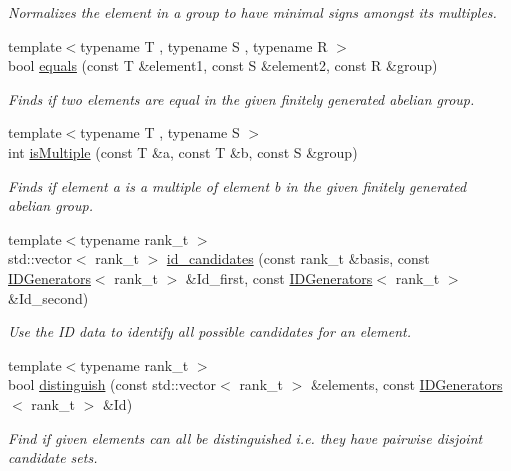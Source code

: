 \begin{DoxyCompactItemize}
\begin{DoxyCompactList}\small\item\em Normalizes the element in a group to have minimal signs amongst its multiples. \end{DoxyCompactList}\item 
{\footnotesize template$<$typename T , typename S , typename R $>$ }\\bool \hyperlink{namespaceMackey_a82dd9e46100ec78b6238a3b60a5b1b45}{equals} (const T \&element1, const S \&element2, const R \&group)
\begin{DoxyCompactList}\small\item\em Finds if two elements are equal in the given finitely generated abelian group. \end{DoxyCompactList}\item 
{\footnotesize template$<$typename T , typename S $>$ }\\int \hyperlink{namespaceMackey_aef81f82c080c97bb31154524af52b62c}{is\+Multiple} (const T \&a, const T \&b, const S \&group)
\begin{DoxyCompactList}\small\item\em Finds if element a is a multiple of element b in the given finitely generated abelian group. \end{DoxyCompactList}\item 
{\footnotesize template$<$typename rank\+\_\+t $>$ }\\std\+::vector$<$ rank\+\_\+t $>$ \hyperlink{namespaceMackey_a83ac78e6d1695af40d0fa58af5255e84}{id\+\_\+candidates} (const rank\+\_\+t \&basis, const \hyperlink{classMackey_1_1IDGenerators}{I\+D\+Generators}$<$ rank\+\_\+t $>$ \&Id\+\_\+first, const \hyperlink{classMackey_1_1IDGenerators}{I\+D\+Generators}$<$ rank\+\_\+t $>$ \&Id\+\_\+second)
\begin{DoxyCompactList}\small\item\em Use the ID data to identify all possible candidates for an element. \end{DoxyCompactList}\item 
{\footnotesize template$<$typename rank\+\_\+t $>$ }\\bool \hyperlink{namespaceMackey_a281b9be315d7d51c7e691d4c733ac0c9}{distinguish} (const std\+::vector$<$ rank\+\_\+t $>$ \&elements, const \hyperlink{classMackey_1_1IDGenerators}{I\+D\+Generators}$<$ rank\+\_\+t $>$ \&Id)
\begin{DoxyCompactList}\small\item\em Find if given elements can all be distinguished i.\+e. they have pairwise disjoint candidate sets. \end{DoxyCompactList}\item 

\end{DoxyCompactItemize}
